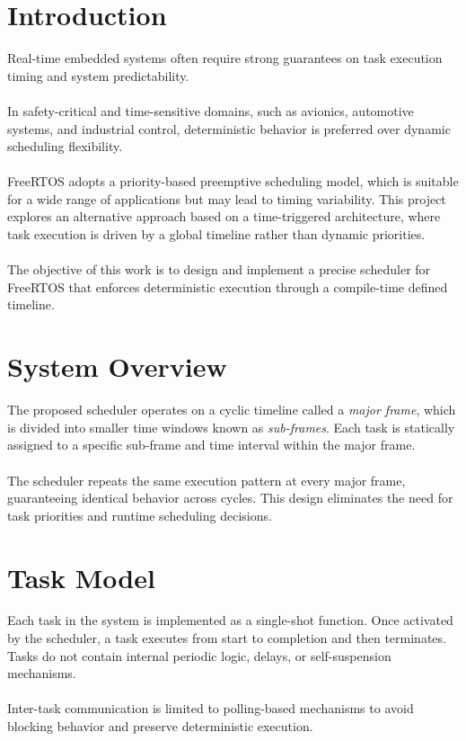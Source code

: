 \documentclass[12pt,english, makeidx, a4paper, titlepage,oneside]{article}
\begin{document}
\newpage

\section{Introduction}
Real-time embedded systems often require strong guarantees on task execution timing and system predictability.
\\~\\
In safety-critical and time-sensitive domains, such as avionics, automotive systems, and industrial control, deterministic behavior is preferred over dynamic scheduling flexibility.
\\~\\
FreeRTOS adopts a priority-based preemptive scheduling model, which is suitable for a wide range of applications but may lead to timing variability.
This project explores an alternative approach based on a time-triggered architecture, where task execution is driven by a global timeline rather than dynamic priorities.
\\~\\
The objective of this work is to design and implement a precise scheduler for FreeRTOS that enforces deterministic execution through a compile-time defined timeline.

\section{System Overview}
The proposed scheduler operates on a cyclic timeline called a \textit{major frame}, which is divided into smaller time windows known as \textit{sub-frames}.
Each task is statically assigned to a specific sub-frame and time interval within the major frame.
\\~\\
The scheduler repeats the same execution pattern at every major frame, guaranteeing identical behavior across cycles.
This design eliminates the need for task priorities and runtime scheduling decisions.

\section{Task Model}
Each task in the system is implemented as a single-shot function.
Once activated by the scheduler, a task executes from start to completion and then terminates.
Tasks do not contain internal periodic logic, delays, or self-suspension mechanisms.
\\~\\
Inter-task communication is limited to polling-based mechanisms to avoid blocking behavior and preserve deterministic execution.
\end{document}
